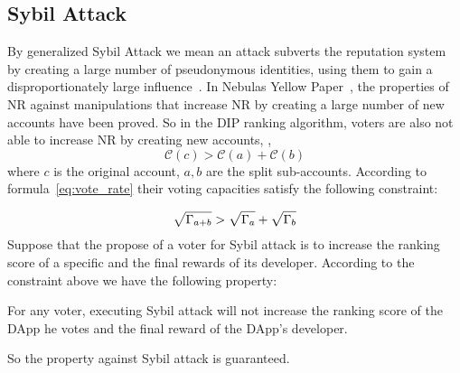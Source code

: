 \subsection{Sybil Attack}
By generalized Sybil Attack we mean an attack subverts the reputation system by creating a large number of pseudonymous identities, using them to gain a disproportionately large influence~\cite{quercia2010sybil}. In Nebulas Yellow Paper~\cite{Nebulasyellowpaper}, the properties of NR against manipulations that increase NR by creating a large number of new accounts have been proved. So in the DIP ranking algorithm, voters are also not able to increase NR by creating new accounts, \ie,
$$\mathcal{C}(c)>\mathcal{C}(a)+\mathcal{C}(b)$$
where $c$ is the original account, $a,b$ are the split sub-accounts. According to formula~\ref{eq:vote_rate} their voting capacities satisfy the following constraint:

\begin{align}
	\label{eq:sqrt_nr}
	\sqrt{\Gamma_{a+b}}>\sqrt{\Gamma_a}+\sqrt{\Gamma_b}
\end{align}
Suppose that the propose of a voter for Sybil attack is to increase the ranking score of a specific and the final rewards of its developer. According to the constraint above we have the following property:

\begin{property}
	\label{p3}
    For any voter, executing Sybil attack will not increase the ranking score of the DApp he votes and the final reward of the DApp's developer.
\end{property}
So the property against Sybil attack is guaranteed.

